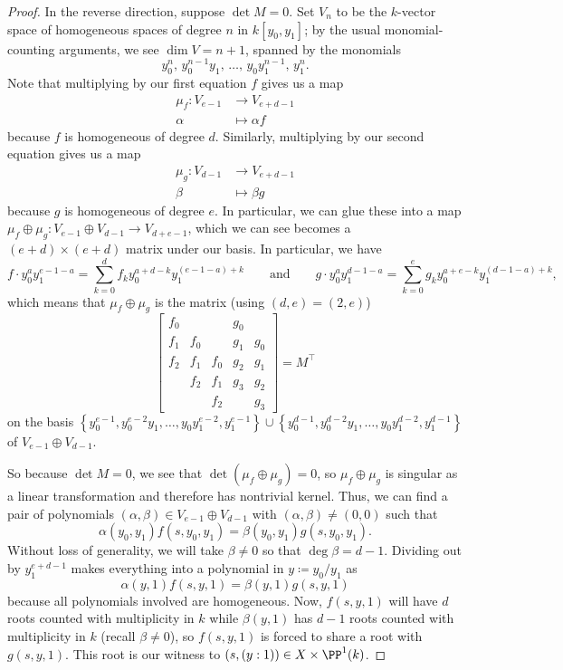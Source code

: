 \documentclass[../notes.tex]{subfiles}
\begin{document}
\begin{proof}
	In the reverse direction, suppose $\det M=0$. Set $V_n$ to be the $k$-vector space of homogeneous spaces of degree $n$ in $k[y_0,y_1]$; by the usual monomial-counting arguments, we see $\dim V=n+1$, spanned by the monomials
	\[y_0^n,\,y_0^{n-1}y_1,\,\ldots,\,y_0y_1^{n-1},\,y_1^n.\]
	Note that multiplying by our first equation $f$ gives us a map
	\begin{align*}
		\mu_f\colon V_{e-1} &\to V_{e+d-1} \\
		\alpha &\mapsto \alpha f
	\end{align*}
	because $f$ is homogeneous of degree $d$. Similarly, multiplying by our second equation gives us a map
	\begin{align*}
		\mu_g\colon V_{d-1} &\to V_{e+d-1} \\
		\beta &\mapsto \beta g
	\end{align*}
	because $g$ is homogeneous of degree $e$. In particular, we can glue these into a map $\mu_f\oplus\mu_g\colon V_{e-1}\oplus V_{d-1}\to V_{d+e-1}$, which we can see becomes a $(e+d)\times(e+d)$ matrix under our basis. In particular, we have
	\[f\cdot y_0^ay_1^{e-1-a}=\sum_{k=0}^df_ky_0^{a+d-k}y_1^{(e-1-a)+k}\qquad\text{and}\qquad g\cdot y_0^ay_1^{d-1-a}=\sum_{k=0}^eg_ky_0^{a+e-k}y_1^{(d-1-a)+k},\]
	which means that $\mu_f\oplus\mu_g$ is the matrix (using $(d,e)=(2,e)$)
	\[\begin{bmatrix}
		f_0 &     &     & g_0 &     \\
		f_1 & f_0 &     & g_1 & g_0 \\
		f_2 & f_1 & f_0 & g_2 & g_1 \\
		    & f_2 & f_1 & g_3 & g_2 \\
			&     & f_2 &     & g_3
	\end{bmatrix}=M^\intercal\]
	on the basis $\left\{y_0^{e-1},y_0^{e-2}y_1,\ldots,y_0y_1^{e-2},y_1^{e-1}\right\}\cup\left\{y_0^{d-1},y_0^{d-2}y_1,\ldots,y_0y_1^{d-2},y_1^{d-1}\right\}$ of $V_{e-1}\oplus V_{d-1}$.
	
	So because $\det M=0$, we see that $\det(\mu_f\oplus\mu_g)=0$, so $\mu_f\oplus\mu_g$ is singular as a linear transformation and therefore has nontrivial kernel. Thus, we can find a pair of polynomials $(\alpha,\beta)\in V_{e-1}\oplus V_{d-1}$ with $(\alpha,\beta)\ne(0,0)$ such that
	\[\alpha(y_0,y_1)f(s,y_0,y_1)=\beta(y_0,y_1)g(s,y_0,y_1).\]
	Without loss of generality, we will take $\beta\ne0$ so that $\deg\beta=d-1$. Dividing out by $y_1^{e+d-1}$ makes everything into a polynomial in $y\coloneqq y_0/y_1$ as
	\[\alpha(y,1)f(s,y,1)=\beta(y,1)g(s,y,1)\]
	because all polynomials involved are homogeneous. Now, $f(s,y,1)$ will have $d$ roots counted with multiplicity in $k$ while $\beta(y,1)$ has $d-1$ roots counted with multiplicity in $k$ (recall $\beta\ne0$), so $f(s,y,1)$ is forced to share a root with $g(s,y,1)$. This root is our witness to $(s,(y:1))\in X\times\PP^1(k)$.
\end{proof}
\end{document}
